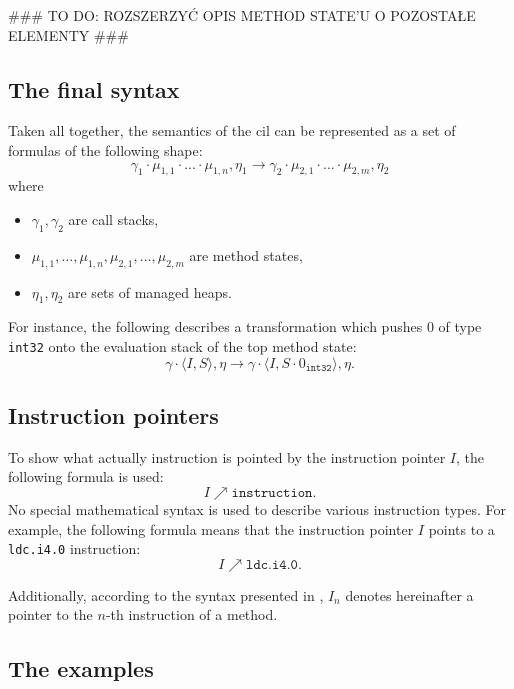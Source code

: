 \documentclass{article}
\numberwithin{equation}{section}
\newcommand{\mstate}[2]{
	\langle#1, #2\rangle
}
\newcommand{\ipointsto}[2] {
	#1 \nearrow \texttt{#2}
}
\begin{document}
\#\#\# TO DO: ROZSZERZYĆ OPIS METHOD STATE'U O POZOSTAŁE ELEMENTY \#\#\#

\subsection{The final syntax}

Taken all together, the semantics of the \acrshort{cil} can be represented as a set of formulas of the following shape:
\begin{equation}
\label{eq:finalSyntax}
	\gamma_1 \cdot \mu_{1,1} \cdot ... \cdot \mu_{1,n}, \eta_1 \rightarrow \gamma_2 \cdot \mu_{2,1} \cdot ... \cdot \mu_{2,m}, \eta_2
\end{equation}
where
\begin{itemize}
	\item{$\gamma_1, \gamma_2$ are call stacks,}
	\item{$\mu_{1,1}, ..., \mu_{1,n}, \mu_{2, 1}, ..., \mu_{2, m}$ are method states,}
	\item{$\eta_1, \eta_2$ are sets of managed heaps.}
\end{itemize}

For instance, the following describes a transformation which pushes 0 of type \texttt{int32} onto the evaluation stack of the top method state:
$$
	\gamma \cdot \mstate{I}{S}, \eta \rightarrow \gamma \cdot \mstate{I}{S \cdot 0_\texttt{int32}}, \eta.
$$

\subsection{Instruction pointers}

To show what actually instruction is pointed by the instruction pointer $I$, the following formula is used:
\begin{equation}
	\ipointsto{I}{instruction}.
\end{equation}
No special mathematical syntax is used to describe various instruction types. For example, the following formula means that the instruction pointer $I$ points to a \texttt{ldc.i4.0} instruction:
$$
	\ipointsto{I}{ldc.i4.0}.
$$

Additionally, according to the syntax presented in \cite{zychlaThesis}, $I_n$ denotes hereinafter a pointer to the $n$-th instruction of a method.

\subsection{The examples}
\end{document}

